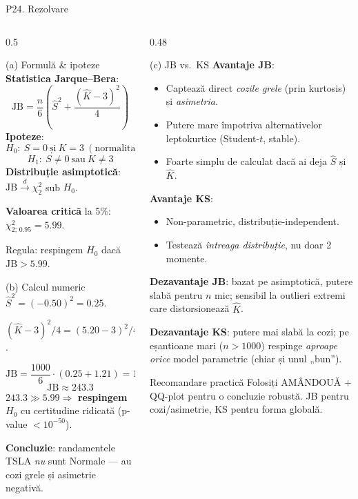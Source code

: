 \documentclass[9pt, aspectratio=169, t]{beamer}
\begin{document}
\begin{frame}[shrink=45]{P24. Rezolvare}
\begin{columns}[T]
\begin{column}{0.5\textwidth}
\begin{block}{(a) Formulă \& ipoteze}
\textbf{Statistica Jarque--Bera}:
\[
\text{JB} = \frac{n}{6}\left(\hat S^2 + \frac{(\hat K - 3)^2}{4}\right)
\]
\textbf{Ipoteze}:
\[
H_0:\ S=0\ \text{și}\ K=3\ (\text{normalitate})
\]
\[
H_1:\ S\neq 0\ \text{sau}\ K\neq 3
\]
\textbf{Distribuție asimptotică}: $\text{JB} \overset{d}{\to} \chi^2_2$ sub $H_0$.

\textbf{Valoarea critică} la 5\%: $\chi^2_{2;\,0.95} = \mathbf{5.99}$.

Regula: respingem $H_0$ dacă $\text{JB} > 5.99$.
\end{block}
\begin{block}{(b) Calcul numeric}
$\hat S^2 = (-0.50)^2 = 0.25$.

$(\hat K - 3)^2/4 = (5.20-3)^2/4 = 4.84/4 = 1.21$.

\[
\text{JB} = \frac{1000}{6}\cdot(0.25 + 1.21) = 166.67\cdot 1.46
\]
\[
\boxed{\text{JB} \approx \mathbf{243.3}}
\]
$243.3 \gg 5.99 \Rightarrow$ \textbf{respingem} $H_0$ cu certitudine ridicată (p-value $< 10^{-50}$).

\textbf{Concluzie}: randamentele TSLA \emph{nu} sunt Normale --- au cozi grele și asimetrie negativă.
\end{block}
\end{column}
\begin{column}{0.48\textwidth}
\begin{block}{(c) JB vs.\ KS}
\textbf{Avantaje JB}:
\begin{itemize}\setlength{\itemsep}{0pt}
    \item Captează direct \emph{cozile grele} (prin kurtosis) și \emph{asimetria}.
    \item Putere mare împotriva alternativelor leptokurtice (Student-$t$, stable).
    \item Foarte simplu de calculat dacă ai deja $\hat S$ și $\hat K$.
\end{itemize}
\textbf{Avantaje KS}:
\begin{itemize}\setlength{\itemsep}{0pt}
    \item Non-parametric, distribuție-independent.
    \item Testează \emph{întreaga distribuție}, nu doar 2 momente.
\end{itemize}
\textbf{Dezavantaje JB}: bazat pe asimptotică, putere slabă pentru $n$ mic; sensibil la outlieri extremi care distorsionează $\hat K$.

\textbf{Dezavantaje KS}: putere mai slabă la cozi; pe eșantioane mari ($n>1000$) respinge \emph{aproape orice} model parametric (chiar și unul „bun'').
\end{block}
\begin{alertblock}{Recomandare practică}
Folosiți AMÂNDOUĂ + QQ-plot pentru o concluzie robustă. JB pentru cozi/asimetrie, KS pentru forma globală.
\end{alertblock}
\end{column}
\end{columns}
\end{frame}
\end{document}
